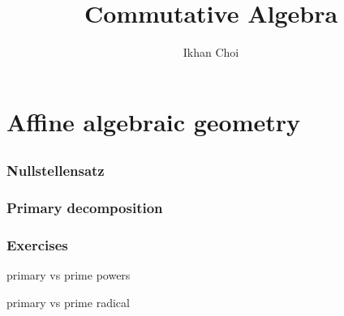 \documentclass{../../large}
\begin{document}
\title{Commutative Algebra}
\author{Ikhan Choi}
\maketitle
\tableofcontents

\part{Affine algebraic geometry}
\chapter{}
\section{Nullstellensatz}

\section{Primary decomposition}


\section*{Exercises}

primary vs prime powers

primary vs prime radical



\chapter{}
\end{document}
